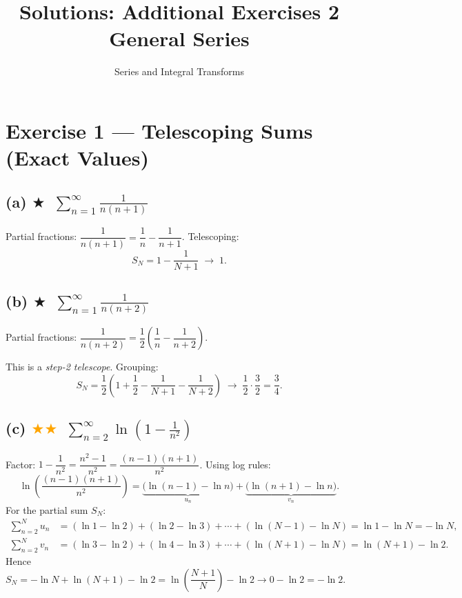 \documentclass[12pt,a4paper]{article}
\title{\textbf{Solutions: Additional Exercises 2}\\General Series}
\author{Series and Integral Transforms}
\date{}
\newcommand{\easy}{\textcolor{green!60!black}{$\bigstar$}}
\newcommand{\medium}{\textcolor{orange}{$\bigstar\bigstar$}}
\begin{document}
\maketitle

\section*{Exercise 1 — Telescoping Sums (Exact Values)}

\subsection*{(a) \easy\ $\displaystyle\sum_{n=1}^{\infty}\frac{1}{n(n+1)}$}

Partial fractions: $\dfrac{1}{n(n+1)}=\dfrac{1}{n}-\dfrac{1}{n+1}$.  Telescoping:
\[
  S_N = 1 - \frac{1}{N+1}\;\to\; \boxed{1}.
\]

\subsection*{(b) \easy\ $\displaystyle\sum_{n=1}^{\infty}\frac{1}{n(n+2)}$}

Partial fractions: $\dfrac{1}{n(n+2)}=\dfrac{1}{2}\!\left(\dfrac{1}{n}-\dfrac{1}{n+2}\right)$.

This is a \emph{step-2 telescope}. Grouping:
\[
  S_N = \frac{1}{2}\!\left(1+\frac{1}{2}-\frac{1}{N+1}-\frac{1}{N+2}\right)
  \;\to\; \frac{1}{2}\cdot\frac{3}{2} = \boxed{\frac{3}{4}}.
\]

\subsection*{(c) \medium\ $\displaystyle\sum_{n=2}^{\infty}\ln\!\left(1-\frac{1}{n^2}\right)$}

Factor: $1-\dfrac{1}{n^2}=\dfrac{n^2-1}{n^2}=\dfrac{(n-1)(n+1)}{n^2}$.  Using log rules:
\[
  \ln\!\left(\frac{(n-1)(n+1)}{n^2}\right)
  = \underbrace{\bigl(\ln(n-1)-\ln n\bigr)}_{u_n}
  + \underbrace{\bigl(\ln(n+1)-\ln n\bigr)}_{v_n}.
\]
For the partial sum $S_N$:
\begin{align*}
  \sum_{n=2}^{N} u_n &= (\ln 1-\ln 2)+(\ln 2-\ln 3)+\cdots+(\ln(N-1)-\ln N)
    = \ln 1-\ln N = -\ln N,\\
  \sum_{n=2}^{N} v_n &= (\ln 3-\ln 2)+(\ln 4-\ln 3)+\cdots+(\ln(N+1)-\ln N)
    = \ln(N+1)-\ln 2.
\end{align*}
Hence $S_N = -\ln N + \ln(N+1) - \ln 2 = \ln\!\left(\dfrac{N+1}{N}\right) - \ln 2 \to 0 - \ln 2 = \boxed{-\ln 2}$.
\end{document}
